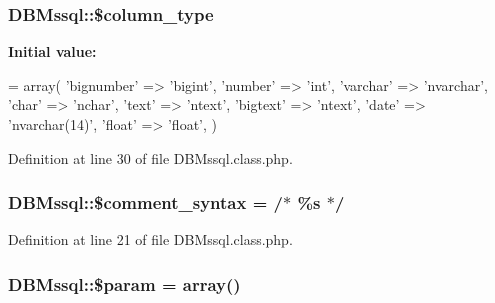 \subsubsection[{\texorpdfstring{\$column\+\_\+type}{$column_type}}]{\setlength{\rightskip}{0pt plus 5cm}D\+B\+Mssql\+::\$column\+\_\+type}\hypertarget{classDBMssql_a785e589df00c87bb0003b573aa5d7fee}{}\label{classDBMssql_a785e589df00c87bb0003b573aa5d7fee}
{\bfseries Initial value\+:}
\begin{DoxyCode}
= array(
        \textcolor{stringliteral}{'bignumber'} => \textcolor{stringliteral}{'bigint'},
        \textcolor{stringliteral}{'number'} => \textcolor{stringliteral}{'int'},
        \textcolor{stringliteral}{'varchar'} => \textcolor{stringliteral}{'nvarchar'},
        \textcolor{stringliteral}{'char'} => \textcolor{stringliteral}{'nchar'},
        \textcolor{stringliteral}{'text'} => \textcolor{stringliteral}{'ntext'},
        \textcolor{stringliteral}{'bigtext'} => \textcolor{stringliteral}{'ntext'},
        \textcolor{stringliteral}{'date'} => \textcolor{stringliteral}{'nvarchar(14)'},
        \textcolor{stringliteral}{'float'} => \textcolor{stringliteral}{'float'},
    )
\end{DoxyCode}


Definition at line 30 of file D\+B\+Mssql.\+class.\+php.

\subsubsection[{\texorpdfstring{\$comment\+\_\+syntax}{$comment_syntax}}]{\setlength{\rightskip}{0pt plus 5cm}D\+B\+Mssql\+::\$comment\+\_\+syntax = \textquotesingle{}/$\ast$ \%{\bf s} $\ast$/\textquotesingle{}}\hypertarget{classDBMssql_ad095d953d508f44a326586a10c95336d}{}\label{classDBMssql_ad095d953d508f44a326586a10c95336d}


Definition at line 21 of file D\+B\+Mssql.\+class.\+php.

\subsubsection[{\texorpdfstring{\$param}{$param}}]{\setlength{\rightskip}{0pt plus 5cm}D\+B\+Mssql\+::\$param = array()}\hypertarget{classDBMssql_a352ee40852cea6dc20de096486603805}{}\label{classDBMssql_a352ee40852cea6dc20de096486603805}


